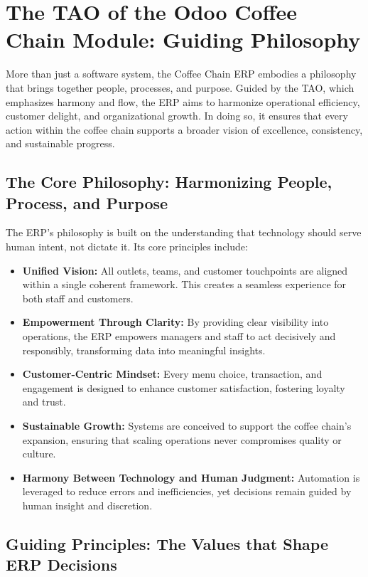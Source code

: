 \chapter{The TAO of the Odoo Coffee Chain Module: Guiding Philosophy}

More than just a software system, the Coffee Chain ERP embodies a philosophy that brings together people, processes, and purpose. Guided by the TAO, which emphasizes harmony and flow, the ERP aims to harmonize operational efficiency, customer delight, and organizational growth. In doing so, it ensures that every action within the coffee chain supports a broader vision of excellence, consistency, and sustainable progress.
\section{The Core Philosophy: Harmonizing People, Process, and Purpose}

The ERP’s philosophy is built on the understanding that technology should serve human intent, not dictate it. Its core principles include:

\begin{itemize}
    \item \textbf{Unified Vision:} All outlets, teams, and customer touchpoints are aligned within a single coherent framework. This creates a seamless experience for both staff and customers.  
    \item \textbf{Empowerment Through Clarity:} By providing clear visibility into operations, the ERP empowers managers and staff to act decisively and responsibly, transforming data into meaningful insights.  
    \item \textbf{Customer-Centric Mindset:} Every menu choice, transaction, and engagement is designed to enhance customer satisfaction, fostering loyalty and trust.  
    \item \textbf{Sustainable Growth:} Systems are conceived to support the coffee chain’s expansion, ensuring that scaling operations never compromises quality or culture.  
    \item \textbf{Harmony Between Technology and Human Judgment:} Automation is leveraged to reduce errors and inefficiencies, yet decisions remain guided by human insight and discretion.  
\end{itemize}

\section{Guiding Principles: The Values that Shape ERP Decisions}

